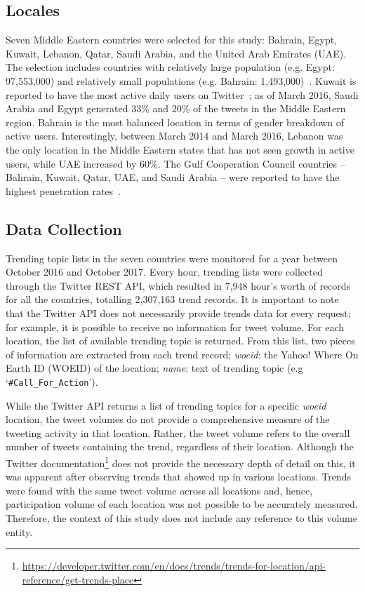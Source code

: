 \documentclass{comjnl}
\begin{document}
\subsection{Locales}

Seven Middle Eastern countries were selected for this study: Bahrain, Egypt, Kuwait, Lebanon, Qatar, Saudi Arabia, and the United Arab Emirates (UAE). The selection includes countries with relatively large population (e.g. Egypt: 97,553,000) and relatively small populations (e.g. Bahrain: 1,493,000)~\cite{UnitedNationsDepartmentofEconomicandSocialAffairs2017}. Kuwait is reported to have the most active daily users on Twitter~\cite{Salem2017}; as of March 2016, Saudi Arabia and Egypt generated 33\% and 20\% of the tweets in the Middle Eastern region. Bahrain is the most balanced location in terms of gender breakdown of active users. Interestingly, between March 2014 and March 2016, Lebanon was the only location in the Middle Eastern states that has not seen growth in active users, while UAE increased by 60\%. The Gulf Cooperation Council countries -- Bahrain, Kuwait, Qatar, UAE, and Saudi Arabia -- were reported to have the highest penetration rates~\cite{Salem2017}.

\subsection{Data Collection}

Trending topic lists in the seven countries were monitored for a year between October 2016 and October 2017. Every hour, trending lists were collected through the Twitter REST API, which resulted in 7,948 hour's worth of records for all the countries, totalling 2,307,163 trend records. It is important to note that the Twitter API does not necessarily provide trends data for every request; for example, it is possible to receive no information for tweet volume. For each location, the list of available trending topic is returned. From this list, two pieces of information are extracted from each trend record; {\emph{woeid}}: the Yahoo! Where On Earth ID (WOEID) of the location; {\emph{name}}: text of trending topic (e.g `{\texttt{\#Call\_For\_Action}}').

While the Twitter API returns a list of trending topics for a specific {\emph{woeid}} location, the tweet volumes do not provide a comprehensive measure of the tweeting activity in that location. Rather, the tweet volume refers to the overall number of tweets containing the trend, regardless of their location. Although the Twitter documentation\footnote{\url{https://developer.twitter.com/en/docs/trends/trends-for-location/api-reference/get-trends-place}} does not provide the necessary depth of detail on this, it was apparent after observing trends that showed up in various locations. Trends were found with the same tweet volume across all locations and, hence, participation volume of each location was not possible to be accurately measured. Therefore, the context of this study does not include any reference to this volume entity.
\end{document}
